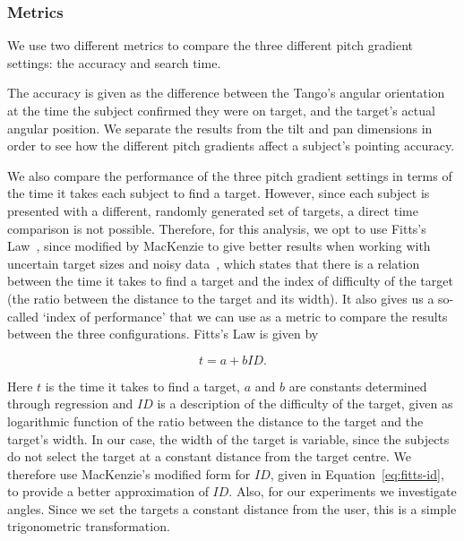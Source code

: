 \documentclass[format=sigconf, review=true, screen=true, anonymous=true]{acmart}
\begin{document}
\subsubsection{Metrics}

We use two different metrics to compare the three different pitch gradient settings: the accuracy and search time. 

The accuracy is given as the difference between the Tango's angular orientation at the time the subject confirmed they were on target, and the target's actual angular position. We separate the results from the tilt and pan dimensions in order to see how the different pitch gradients affect a subject's pointing accuracy. 


We also compare the performance of the three pitch gradient settings in terms of the time it takes each subject to find a target. However, since each subject is presented with a different, randomly generated set of targets, a direct time comparison is not possible. Therefore, for this analysis, we opt to use Fitts's Law~\cite{fitts1954information}, since modified by MacKenzie to give better results when working with uncertain target sizes and noisy data~\cite{mackenzie1992fitts}, which states that there is a relation between the time it takes to find a target and the index of difficulty of the target (the ratio between the distance to the target and its width). It also gives us a so-called `index of performance' that we can use as a metric to compare the results between the three configurations. Fitts's Law is given by  

\begin{equation}
  \label{eq:fitts-base}
  t = a + bID.%
\end{equation}


Here $t$ is the time it takes to find a target, $a$ and $b$ are constants determined through regression and $ID$ is a description of the difficulty of the target, given as logarithmic function of the ratio between the distance to the target and the target's width. In our case, the width of the target is variable, since the subjects do not select the target at a constant distance from the target centre. We therefore use MacKenzie's modified form for $ID$, given in Equation~\ref{eq:fitts-id}, to provide a better approximation of $ID$. Also, for our experiments we investigate angles. Since we set the targets a constant distance from the user, this is a simple trigonometric transformation.
\end{document}
